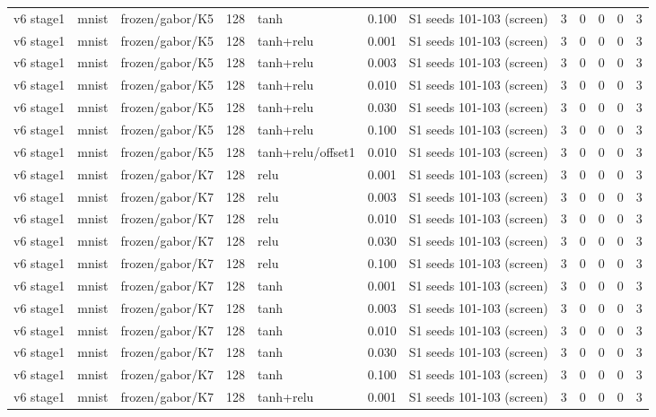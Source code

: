 \begin{table}[htbp]
{\begin{tabular}{@{}lllrlrlrrrrr@{}}
v6 stage1 & mnist & frozen/gabor/K5 & 128 & tanh & 0.100 & S1 seeds 101-103 (screen) & 3 & 0 & 0 & 0 & 3 \\
v6 stage1 & mnist & frozen/gabor/K5 & 128 & tanh+relu & 0.001 & S1 seeds 101-103 (screen) & 3 & 0 & 0 & 0 & 3 \\
v6 stage1 & mnist & frozen/gabor/K5 & 128 & tanh+relu & 0.003 & S1 seeds 101-103 (screen) & 3 & 0 & 0 & 0 & 3 \\
v6 stage1 & mnist & frozen/gabor/K5 & 128 & tanh+relu & 0.010 & S1 seeds 101-103 (screen) & 3 & 0 & 0 & 0 & 3 \\
v6 stage1 & mnist & frozen/gabor/K5 & 128 & tanh+relu & 0.030 & S1 seeds 101-103 (screen) & 3 & 0 & 0 & 0 & 3 \\
v6 stage1 & mnist & frozen/gabor/K5 & 128 & tanh+relu & 0.100 & S1 seeds 101-103 (screen) & 3 & 0 & 0 & 0 & 3 \\
v6 stage1 & mnist & frozen/gabor/K5 & 128 & tanh+relu/offset1 & 0.010 & S1 seeds 101-103 (screen) & 3 & 0 & 0 & 0 & 3 \\
v6 stage1 & mnist & frozen/gabor/K7 & 128 & relu & 0.001 & S1 seeds 101-103 (screen) & 3 & 0 & 0 & 0 & 3 \\
v6 stage1 & mnist & frozen/gabor/K7 & 128 & relu & 0.003 & S1 seeds 101-103 (screen) & 3 & 0 & 0 & 0 & 3 \\
v6 stage1 & mnist & frozen/gabor/K7 & 128 & relu & 0.010 & S1 seeds 101-103 (screen) & 3 & 0 & 0 & 0 & 3 \\
v6 stage1 & mnist & frozen/gabor/K7 & 128 & relu & 0.030 & S1 seeds 101-103 (screen) & 3 & 0 & 0 & 0 & 3 \\
v6 stage1 & mnist & frozen/gabor/K7 & 128 & relu & 0.100 & S1 seeds 101-103 (screen) & 3 & 0 & 0 & 0 & 3 \\
v6 stage1 & mnist & frozen/gabor/K7 & 128 & tanh & 0.001 & S1 seeds 101-103 (screen) & 3 & 0 & 0 & 0 & 3 \\
v6 stage1 & mnist & frozen/gabor/K7 & 128 & tanh & 0.003 & S1 seeds 101-103 (screen) & 3 & 0 & 0 & 0 & 3 \\
v6 stage1 & mnist & frozen/gabor/K7 & 128 & tanh & 0.010 & S1 seeds 101-103 (screen) & 3 & 0 & 0 & 0 & 3 \\
v6 stage1 & mnist & frozen/gabor/K7 & 128 & tanh & 0.030 & S1 seeds 101-103 (screen) & 3 & 0 & 0 & 0 & 3 \\
v6 stage1 & mnist & frozen/gabor/K7 & 128 & tanh & 0.100 & S1 seeds 101-103 (screen) & 3 & 0 & 0 & 0 & 3 \\
v6 stage1 & mnist & frozen/gabor/K7 & 128 & tanh+relu & 0.001 & S1 seeds 101-103 (screen) & 3 & 0 & 0 & 0 & 3 \\

\end{tabular}}
\end{table}
